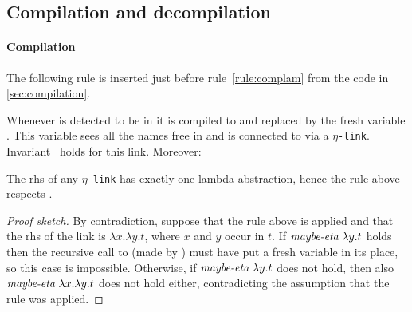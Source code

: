 \documentclass[sigconf,natbib=false,review]{acmart}
\newcommand{\appsep}{\ensuremath{\textcolor{lightgray}{\cdot}}}
\newcommand{\linkMacro}[1]{\ensuremath{#1}\texttt{-link}\xspace}
\newcommand{\linketa} {\linkMacro{\eta}}
\newcommand{\Ho}{\texorpdfstring{\ensuremath{\mathcal{M}}\xspace}{M}}
\newcommand{\rhs}{rhs\xspace}
\begin{document}

% 


\subsection{Compilation and decompilation}\label{sec:etacomp}


\paragraph{Compilation}
The following rule is inserted just before rule~\ref{rule:complam} from the code in
\cref{sec:compilation}.



\noindent
Whenever  is detected to be in
\maybeeta it is compiled to  and replaced by the fresh
variable . This variable sees all the names free in
 and is connected to  via a \linketa.
Invariant~ holds for this link. Moreover:

\begin{corollary}
  The \rhs of any \linketa has exactly one lambda abstraction, hence
  the rule above respects .
  \label{cor:rhs-eta-onelamb}
\end{corollary}

\begin{proof}[Proof sketch]
  By contradiction, suppose that the rule above is applied and that
  the \rhs of the link is $\lambda x.\lambda y.t$, where $x$ and $y$ occur in $t$.
  If $\emph{maybe-eta}{}~\lambda y.t$ holds then the recursive call to
   (made by ) must have put a fresh variable
  in its place, so this case is impossible.
  Otherwise, if $\emph{maybe-eta}{}~\lambda y.t$ does not hold, then also
  $\emph{maybe-eta}{}~\lambda x.\lambda y.t$ does not hold either, contradicting
  the assumption that the rule was applied.
\end{proof}
\end{document}
